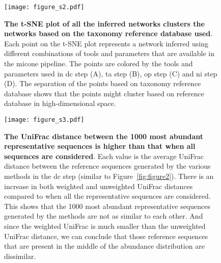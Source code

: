     \begin{figure}[H]
      \centering
      \texttt{[image: figure\_s2.pdf]}
    \end{figure}
    \begin{figure}[H]
      \centering
        \caption{
          \textbf{The t-SNE plot of all the inferred networks clusters the networks based on the taxonomy reference database used}.
          Each point on the t-SNE plot represents a network inferred using different combinations of tools and parameters that are available in the \ac{micone} pipeline.
          The points are colored by the tools and parameters used in \ac{dc} step (A), \ac{ta} step (B), \ac{op} step (C) and \ac{ni} step (D).
          The separation of the points based on taxonomy reference database shows that the points might cluster based on reference database in high-dimensional space.
        }
      \label{fig:figure_s2}
    \end{figure}
    \FloatBarrier
    \newpage

    \begin{figure}[H]
      \centering
      \texttt{[image: figure\_s3.pdf]}
    \end{figure}
    \begin{figure}[H]
      \centering
        \caption{
          \textbf{The UniFrac distance between the 1000 most abundant representative sequences is higher than that when all sequences are considered}.
          Each value is the average UniFrac distance between the reference sequences generated by the various methods in the \ac{dc} step (similar to Figure~\ref{fig:figure2}).
          There is an increase in both weighted and unweighted UniFrac distances compared to when all the representative sequences are considered.
          This shows that the 1000 most abundant representative sequences generated by the methods are not as similar to each other.
          And since the weighted UniFrac is much smaller than the unweighted UniFrac distance, we can conclude that those reference sequences that are present in the middle of the abundance distribution are dissimilar.
        }
      \label{fig:figure_s3}
    \end{figure}
    \FloatBarrier
    \newpage

